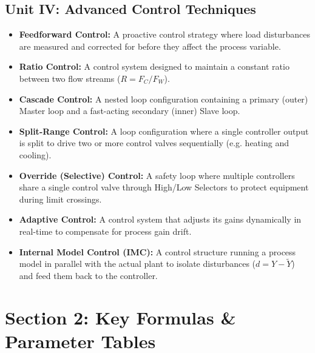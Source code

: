\subsection{Unit IV: Advanced Control Techniques}
\begin{itemize}
  \item \textbf{Feedforward Control:} A proactive control strategy where load disturbances are measured and corrected for before they affect the process variable.
  \item \textbf{Ratio Control:} A control system designed to maintain a constant ratio between two flow streams ($R = F_C / F_W$).
  \item \textbf{Cascade Control:} A nested loop configuration containing a primary (outer) Master loop and a fast-acting secondary (inner) Slave loop.
  \item \textbf{Split-Range Control:} A loop configuration where a single controller output is split to drive two or more control valves sequentially (e.g. heating and cooling).
  \item \textbf{Override (Selective) Control:} A safety loop where multiple controllers share a single control valve through High/Low Selectors to protect equipment during limit crossings.
  \item \textbf{Adaptive Control:} A control system that adjusts its gains dynamically in real-time to compensate for process gain drift.
  \item \textbf{Internal Model Control (IMC):} A control structure running a process model in parallel with the actual plant to isolate disturbances ($d = Y - \tilde{Y}$) and feed them back to the controller.
\end{itemize}


\section{Section 2: Key Formulas \& Parameter Tables}

